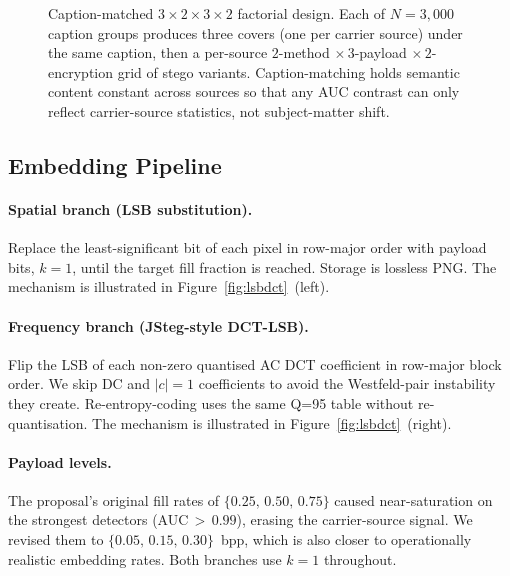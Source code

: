 \documentclass[10pt,twocolumn,a4paper]{article}
\begin{document}
\begin{figure}[t]
\caption{Caption-matched $3\!\times\!2\!\times\!3\!\times\!2$ factorial design. Each of $N\!=\!3{,}000$ caption groups produces three covers (one per carrier source) under the same caption, then a per-source $2$-method $\times\,3$-payload $\times\,2$-encryption grid of stego variants. Caption-matching holds semantic content constant across sources so that any AUC contrast can only reflect carrier-source statistics, not subject-matter shift.}
\label{fig:factorial}
\end{figure}

\subsection{Embedding Pipeline}
\label{sec:embedding}

\paragraph{Spatial branch (LSB substitution).} Replace the least-significant bit of each pixel in row-major order with payload bits, $k\!=\!1$, until the target fill fraction is reached. Storage is lossless PNG. The mechanism is illustrated in Figure~\ref{fig:lsbdct}~(left).

\paragraph{Frequency branch (JSteg-style DCT-LSB).} Flip the LSB of each non-zero quantised AC DCT coefficient in row-major block order. We skip DC and $|c|\!=\!1$ coefficients to avoid the Westfeld-pair instability they create. Re-entropy-coding uses the same Q=95 table without re-quantisation. The mechanism is illustrated in Figure~\ref{fig:lsbdct}~(right).

\paragraph{Payload levels.} The proposal's original fill rates of $\{0.25,\,0.50,\,0.75\}$ caused near-saturation on the strongest detectors (AUC$\,>\,0.99$), erasing the carrier-source signal. We revised them to $\{0.05,\,0.15,\,0.30\}$~bpp, which is also closer to operationally realistic embedding rates. Both branches use $k\!=\!1$ throughout.
\end{document}
